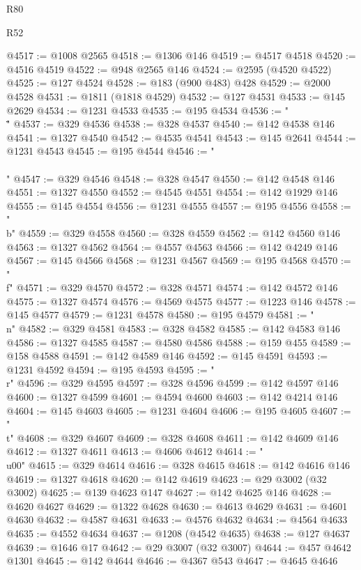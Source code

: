 \begin{lexlean}{R80}
\begin{lexlean}{R52}
\begin{coremodule}
{{{{{{{{{{{{{{{{{{{{{{{{{{{{{{{{{{{{{{{{{{{{{{{{{{{{{{{{{{{{{{{{{{{{{{{{{{{{{{{{{{{{{{{{{{{{{{{{{{{{{{{{{{{{{{{{{{{{{{{{{{{{{{{{{{{{{{{{{{{{{{{{{{{{{{{{{{{{{{{{{{{{{{{{{{{{{{{{{{{{{{{{{{{{{{{{{{{{{{@4517 := @1008 @2565
@4518 := @1306 @146
@4519 := @4517 @4518
@4520 := @4516 @4519
@4522 := @948 @2565 @146
@4524 := @2595 (@4520 @4522)
@4525 := @127 @4524
@4528 := @183 (@900 @483) @428
@4529 := @2000 @4528
@4531 := @1811 (@1818 @4529)
@4532 := @127 @4531
@4533 := @145 @2629
@4534 := @1231 @4533
@4535 := @195 @4534
@4536 := "\\\""
@4537 := @329 @4536
@4538 := @328 @4537
@4540 := @142 @4538 @146
@4541 := @1327 @4540
@4542 := @4535 @4541
@4543 := @145 @2641
@4544 := @1231 @4543
@4545 := @195 @4544
@4546 := "\\\\"
@4547 := @329 @4546
@4548 := @328 @4547
@4550 := @142 @4548 @146
@4551 := @1327 @4550
@4552 := @4545 @4551
@4554 := @142 @1929 @146
@4555 := @145 @4554
@4556 := @1231 @4555
@4557 := @195 @4556
@4558 := "\\b"
@4559 := @329 @4558
@4560 := @328 @4559
@4562 := @142 @4560 @146
@4563 := @1327 @4562
@4564 := @4557 @4563
@4566 := @142 @4249 @146
@4567 := @145 @4566
@4568 := @1231 @4567
@4569 := @195 @4568
@4570 := "\\f"
@4571 := @329 @4570
@4572 := @328 @4571
@4574 := @142 @4572 @146
@4575 := @1327 @4574
@4576 := @4569 @4575
@4577 := @1223 @146
@4578 := @145 @4577
@4579 := @1231 @4578
@4580 := @195 @4579
@4581 := "\\n"
@4582 := @329 @4581
@4583 := @328 @4582
@4585 := @142 @4583 @146
@4586 := @1327 @4585
@4587 := @4580 @4586
@4588 := @159 @455
@4589 := @158 @4588
@4591 := @142 @4589 @146
@4592 := @145 @4591
@4593 := @1231 @4592
@4594 := @195 @4593
@4595 := "\\r"
@4596 := @329 @4595
@4597 := @328 @4596
@4599 := @142 @4597 @146
@4600 := @1327 @4599
@4601 := @4594 @4600
@4603 := @142 @4214 @146
@4604 := @145 @4603
@4605 := @1231 @4604
@4606 := @195 @4605
@4607 := "\\t"
@4608 := @329 @4607
@4609 := @328 @4608
@4611 := @142 @4609 @146
@4612 := @1327 @4611
@4613 := @4606 @4612
@4614 := "\\u00"
@4615 := @329 @4614
@4616 := @328 @4615
@4618 := @142 @4616 @146
@4619 := @1327 @4618
@4620 := @142 @4619
@4623 := @29 @3002 (@32 @3002)
@4625 := @139 @4623 @147
@4627 := @142 @4625 @146
@4628 := @4620 @4627
@4629 := @1322 @4628
@4630 := @4613 @4629
@4631 := @4601 @4630
@4632 := @4587 @4631
@4633 := @4576 @4632
@4634 := @4564 @4633
@4635 := @4552 @4634
@4637 := @1208 (@4542 @4635)
@4638 := @127 @4637
@4639 := @1646 @17
@4642 := @29 @3007 (@32 @3007)
@4644 := @457 @4642 @1301
@4645 := @142 @4644
@4646 := @4367 @543
@4647 := @4645 @4646
}}}}}}}}}}}}}}}}}}}}}}}}}}}}}}}}}}}}}}}}}}}}}}}}}}}}}}}}}}}}}}}}}}}}}}}}}}}}}}}}}}}}}}}}}}}}}}}}}}}}}}}}}}}}}}}}}}}}}}}}}}}}}}}}}}}}}}}}}}}}}}}}}}}}}}}}}}}}}}}}}}}}}}}}}}}}}}}}}}}}}}}}}}}}}}}}}}}}}}
\end{coremodule}
\end{lexlean}
\end{lexlean}
